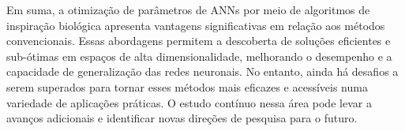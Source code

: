 \documentclass[conference]{IEEEtran}
\begin{document}
Em suma, a otimização de parâmetros de ANNs por meio de algoritmos de inspiração biológica apresenta vantagens significativas em relação aos métodos convencionais. Essas abordagens permitem a descoberta de soluções eficientes e sub-ótimas em espaços de alta dimensionalidade, melhorando o desempenho e a capacidade de generalização das redes neuronais. No entanto, ainda há desafios a serem superados para tornar esses métodos mais eficazes e acessíveis numa variedade de aplicações práticas. O estudo contínuo nessa área pode levar a avanços adicionais e identificar novas direções de pesquisa para o futuro.



\end{document}

